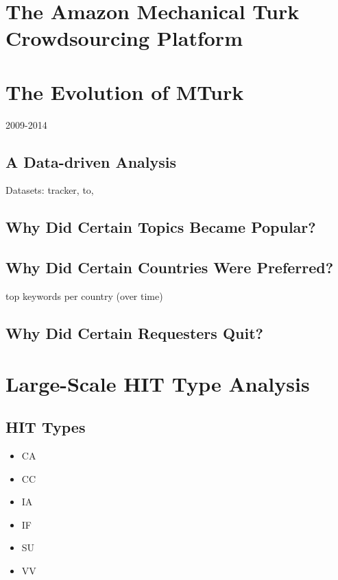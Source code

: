 \documentclass{sig-alternate}
\begin{document}





\section{The Amazon Mechanical Turk Crowdsourcing Platform}

\section{The Evolution of MTurk}
2009-2014
\subsection{A Data-driven Analysis}
Datasets: tracker, to, 
\subsection{Why Did Certain Topics Became Popular?}
\subsection{Why Did Certain Countries Were Preferred?}
top keywords per country (over time)
\subsection{Why Did Certain Requesters Quit?}

\section{Large-Scale HIT Type Analysis}

\subsection{HIT Types}
\begin{itemize}

	\item CA

	\item CC

	\item IA

	\item IF

	\item SU

	\item VV

\end{itemize}
\end{document}
